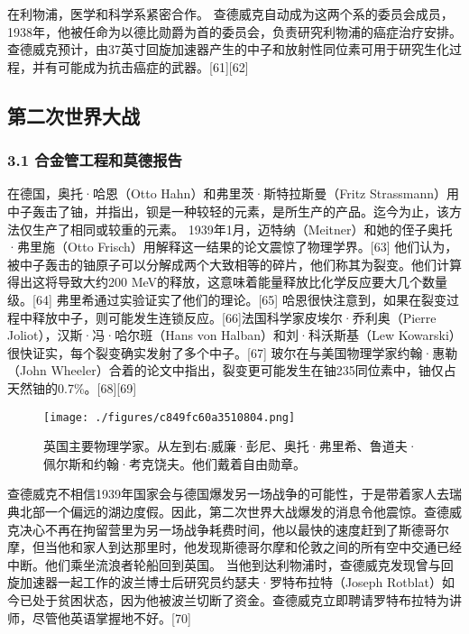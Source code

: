 在利物浦，医学和科学系紧密合作。 查德威克自动成为这两个系的委员会成员，1938年，他被任命为以德比勋爵为首的委员会，负责研究利物浦的癌症治疗安排。 查德威克预计，由37英寸回旋加速器产生的中子和放射性同位素可用于研究生化过程，并有可能成为抗击癌症的武器。[61][62]

\subsection{第二次世界大战}
\subsubsection{3.1 合金管工程和莫德报告}
在德国，奥托·哈恩（Otto Hahn）和弗里茨·斯特拉斯曼（Fritz Strassmann）用中子轰击了铀，并指出，钡是一种较轻的元素，是所生产的产品。迄今为止，该方法仅生产了相同或较重的元素。 1939年1月，迈特纳（Meitner）和她的侄子奥托·弗里施（Otto Frisch）用解释这一结果的论文震惊了物理学界。[63] 他们认为，被中子轰击的铀原子可以分解成两个大致相等的碎片，他们称其为裂变。他们计算得出这将导致大约200 MeV的释放，这意味着能量释放比化学反应要大几个数量级。[64] 弗里希通过实验证实了他们的理论。[65] 哈恩很快注意到，如果在裂变过程中释放中子，则可能发生连锁反应。[66]法国科学家皮埃尔·乔利奥（Pierre Joliot），汉斯·冯·哈尔班（Hans von Halban）和刘·科沃斯基（Lew Kowarski）很快证实，每个裂变确实发射了多个中子。[67] 玻尔在与美国物理学家约翰·惠勒（John Wheeler）合着的论文中指出，裂变更可能发生在铀235同位素中，铀仅占天然铀的0.7\%。[68][69]
\begin{figure}[ht]
\centering
\texttt{[image: ./figures/c849fc60a3510804.png]}
\caption{英国主要物理学家。从左到右:威廉·彭尼、奥托·弗里希、鲁道夫·佩尔斯和约翰·考克饶夫。他们戴着自由勋章。} \label{fig_CHFR_5}
\end{figure}
查德威克不相信1939年国家会与德国爆发另一场战争的可能性，于是带着家人去瑞典北部一个偏远的湖边度假。因此，第二次世界大战爆发的消息令他震惊。查德威克决心不再在拘留营里为另一场战争耗费时间，他以最快的速度赶到了斯德哥尔摩，但当他和家人到达那里时，他发现斯德哥尔摩和伦敦之间的所有空中交通已经中断。他们乘坐流浪者轮船回到英国。 当他到达利物浦时，查德威克发现曾与回旋加速器一起工作的波兰博士后研究员约瑟夫·罗特布拉特（Joseph Rotblat）如今已处于贫困状态，因为他被波兰切断了资金。查德威克立即聘请罗特布拉特为讲师，尽管他英语掌握地不好。[70]

